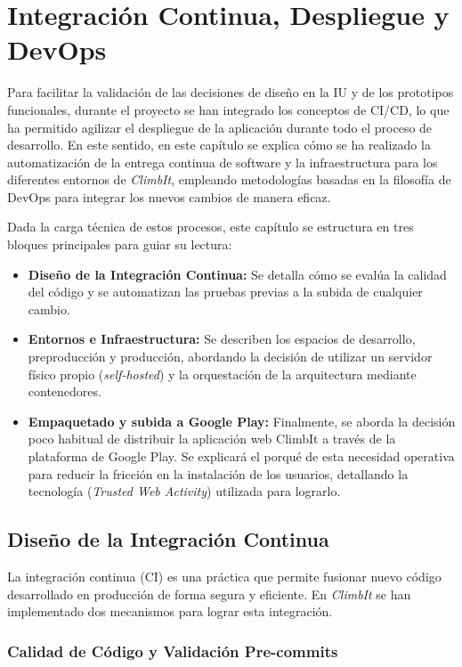 \chapter{Integración Continua, Despliegue y DevOps}
\label{cap:cicd}

Para facilitar la validación de las decisiones de diseño en la IU y de los prototipos funcionales, durante el proyecto se han integrado los conceptos de CI/CD, lo que ha permitido agilizar el despliegue de la aplicación durante todo el proceso de desarrollo. En este sentido, en este capítulo se explica cómo se ha realizado la automatización de la entrega continua de software y la infraestructura para los diferentes entornos de \textit{ClimbIt}, empleando metodologías basadas en la filosofía de DevOps para integrar los nuevos cambios de manera eficaz.

Dada la carga técnica de estos procesos, este capítulo se estructura en tres bloques principales para guiar su lectura:

\begin{itemize}
    \item \textbf{Diseño de la Integración Continua:} Se detalla cómo se evalúa la calidad del código y se automatizan las pruebas previas a la subida de cualquier cambio.
    \item \textbf{Entornos e Infraestructura:} Se describen los espacios de desarrollo, preproducción y producción, abordando la decisión de utilizar un servidor físico propio (\textit{self-hosted}) y la orquestación de la arquitectura mediante contenedores.
    \item \textbf{Empaquetado y subida a Google Play:} Finalmente, se aborda la decisión poco habitual de distribuir la aplicación web ClimbIt a través de la plataforma de Google Play. Se explicará el porqué de esta necesidad operativa para reducir la fricción en la instalación de los usuarios, detallando la tecnología (\textit{Trusted Web Activity}) utilizada para lograrlo.
\end{itemize}
\section{Diseño de la Integración Continua}

La integración continua (CI) es una práctica que permite fusionar nuevo código desarrollado en producción de forma segura y eficiente. En \textit{ClimbIt} se han implementado dos mecanismos para lograr esta integración.

\subsection{Calidad de Código y Validación Pre-commits}

